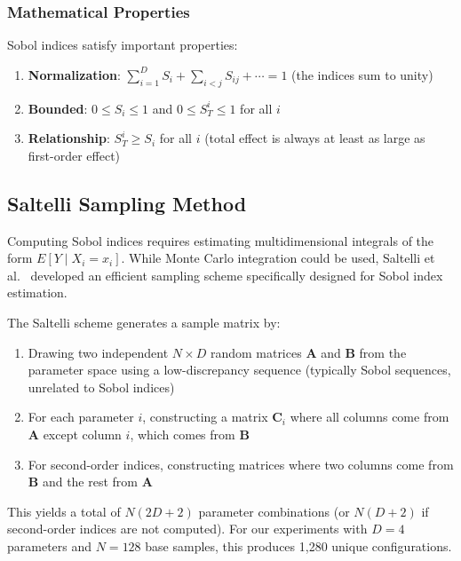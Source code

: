 \subsubsection{Mathematical Properties}

Sobol indices satisfy important properties:

\begin{enumerate}
    \item \textbf{Normalization}: $\sum_{i=1}^{D} S_i + \sum_{i<j} S_{ij} + \cdots = 1$ (the indices sum to unity)
    \item \textbf{Bounded}: $0 \leq S_i \leq 1$ and $0 \leq S_T^i \leq 1$ for all $i$
    \item \textbf{Relationship}: $S_T^i \geq S_i$ for all $i$ (total effect is always at least as large as first-order effect)
\end{enumerate}

\subsection{Saltelli Sampling Method}

Computing Sobol indices requires estimating multidimensional integrals of the form $E[Y \mid X_i = x_i]$. While Monte Carlo integration could be used, Saltelli et al.~\citep{saltelli2010variance} developed an efficient sampling scheme specifically designed for Sobol index estimation.

The Saltelli scheme generates a sample matrix by:

\begin{enumerate}
    \item Drawing two independent $N \times D$ random matrices $\mathbf{A}$ and $\mathbf{B}$ from the parameter space using a low-discrepancy sequence (typically Sobol sequences, unrelated to Sobol indices)
    
    \item For each parameter $i$, constructing a matrix $\mathbf{C}_i$ where all columns come from $\mathbf{A}$ except column $i$, which comes from $\mathbf{B}$
    
    \item For second-order indices, constructing matrices where two columns come from $\mathbf{B}$ and the rest from $\mathbf{A}$
\end{enumerate}

This yields a total of $N(2D + 2)$ parameter combinations (or $N(D + 2)$ if second-order indices are not computed). For our experiments with $D = 4$ parameters and $N = 128$ base samples, this produces 1,280 unique configurations.


